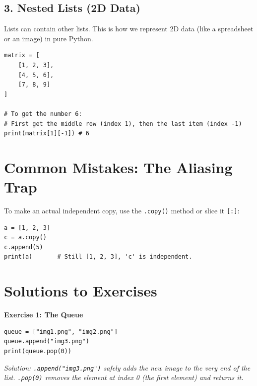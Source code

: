 \subsection{3. Nested Lists (2D Data)}
Lists can contain other lists. This is how we represent 2D data (like a spreadsheet or an image) in pure Python.
\begin{lstlisting}
matrix = [
    [1, 2, 3],
    [4, 5, 6],
    [7, 8, 9]
]

# To get the number 6:
# First get the middle row (index 1), then the last item (index -1)
print(matrix[1][-1]) # 6
\end{lstlisting}

\section{Common Mistakes: The Aliasing Trap}

To make an actual independent copy, use the \texttt{.copy()} method or slice it \texttt{[:]}:
\begin{lstlisting}
a = [1, 2, 3]
c = a.copy()
c.append(5)
print(a)       # Still [1, 2, 3], 'c' is independent.
\end{lstlisting}


\section{Solutions to Exercises}

\textbf{Exercise 1: The Queue}
\begin{lstlisting}
queue = ["img1.png", "img2.png"]
queue.append("img3.png")
print(queue.pop(0))
\end{lstlisting}
\textit{Solution: \texttt{.append("img3.png")} safely adds the new image to the very end of the list. \texttt{.pop(0)} removes the element at index 0 (the first element) and returns it.}


